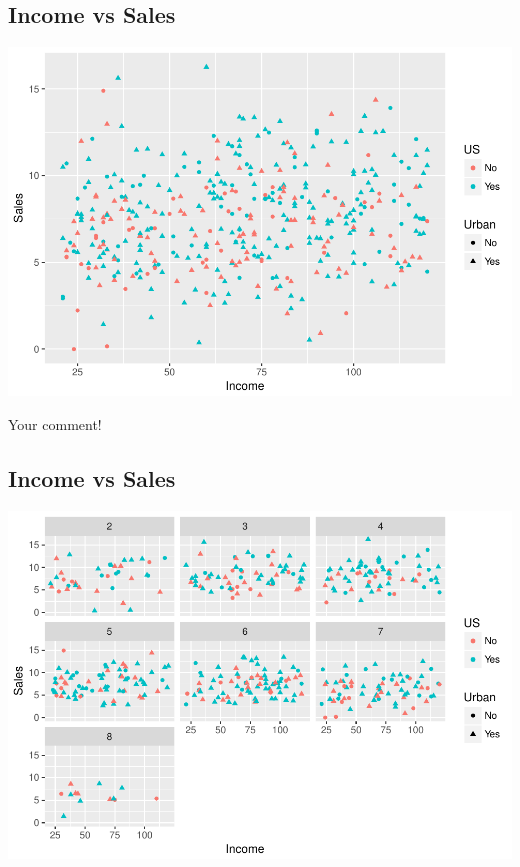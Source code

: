 \documentclass[a4paper]{article}
\begin{document}
\subsection{Income vs Sales}\label{income-vs-sales}

\includegraphics{M23-Carseats-pdf_files/figure-latex/unnamed-chunk-3-1.pdf}

Your comment!

\subsection{Income vs Sales}\label{income-vs-sales-1}

\includegraphics{M23-Carseats-pdf_files/figure-latex/unnamed-chunk-4-1.pdf}
\end{document}
